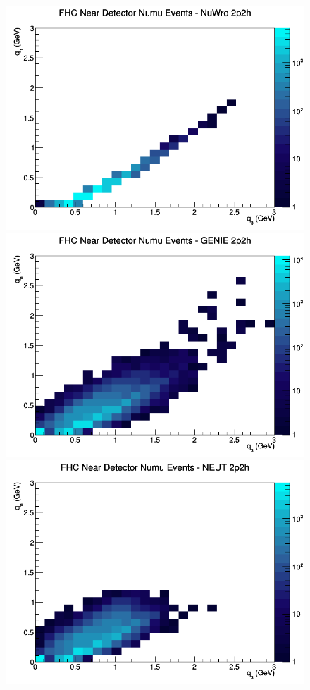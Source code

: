 \documentclass[12pt]{article}
\begin{document}
\begin{figure}[h]
\endminipage
{}
\includegraphics[width=\linewidth]{q0_q3/nominal/2p2h_FHC_ND_numu_q3_q0_NuWro.png}
\endminipage
\newline
{}
\includegraphics[width=\linewidth]{eff_q0_q3/FGT/2p2h_FHC_ND_numu_q3_q0_GENIE.png}
\endminipage
{}
\includegraphics[width=\linewidth]{eff_q0_q3/FGT/2p2h_FHC_ND_numu_q3_q0_NEUT.png}

\end{figure}
\end{document}
